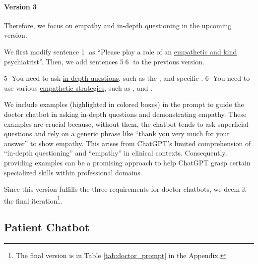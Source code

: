 \paragraph{Version 3}
Therefore, we focus on empathy and in-depth questioning in the upcoming version.

We first modify sentence \textcircled{1} as ``Please play a role of an \uline{empathetic and kind} psychiatrist''. Then, we add sentences \textcircled{5}\textcircled{6} to the previous version.
\begin{prompt}
    \textcircled{5} You need to ask \uline{in-depth questions}, such as the ,  and specific . 
    \textcircled{6} You need to use various \uline{empathetic strategies}, such as ,  and . %
\end{prompt}
We include examples (highlighted in colored boxes) in the prompt to guide the doctor chatbot in asking in-depth questions and demonstrating empathy. These examples are crucial because, without them, the chatbot tends to ask superficial questions and  rely on a generic phrase like ``thank you very much for your answer'' to show empathy. This arises from ChatGPT's limited comprehension of ``in-depth questioning'' and ``empathy'' in clinical contexts. Consequently, providing examples can be a promising approach to help ChatGPT grasp certain specialized skills within professional domains.

Since this version fulfills the three requirements for doctor chatbots, we deem it the final iteration\footnote{The final version is in Table \ref{tab:doctor_prompt} in the Appendix.}. 


\subsection{Patient Chatbot}
\label{sec:pat_prompt}

